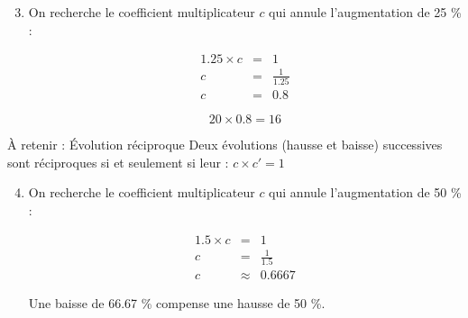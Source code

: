 \documentclass[xcolor={dvipsnames}]{beamer}
\begin{document}


\begin{frame}{}

\begin{enumerate}[1.]
\setcounter{enumi}{2}
\item 

On recherche le coefficient multiplicateur $c$ qui annule l'augmentation de 25 \% :

\begin{eqnarray*}
	\num{1.25} \times c &=& 1 \\
	c &=& \frac{1}{\num{1.25}} \\
	c &=& \num{0.8}
\end{eqnarray*}  
	
\begin{equation*}
	20 \times \num{0.8} = 16
\end{equation*}

\end{enumerate}

\begin{alertblock}{\`A retenir : \'Evolution réciproque}
Deux évolutions (hausse et baisse) successives sont réciproques si et seulement si leur  : $c \times c' = 1$
\end{alertblock}

\end{frame}


\begin{frame}
	\begin{enumerate}[1.]
		\setcounter{enumi}{3}
		\item 
		
		On recherche le coefficient multiplicateur $c$ qui annule l'augmentation de 50 \% :
		
		\begin{eqnarray*}
			\num{1.5} \times c &=& 1 \\
			c &=& \frac{1}{\num{1.5}} \\
			c &\approx& \num{0.6667}
		\end{eqnarray*}  
		
		Une baisse de \num{66.67} \% compense une hausse de 50 \%. 
		
	\end{enumerate}
\end{frame}
\end{document}
